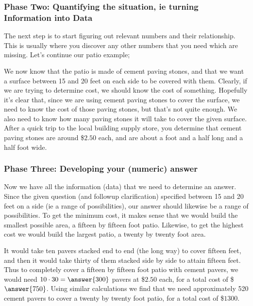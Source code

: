 \documentclass{ximera}
\begin{document}
\subsubsection*{Phase Two: Quantifying the situation, ie turning Information into Data}

    \begin{explanation}
        The next step is to start figuring out relevant numbers and their relationship. This is usually where you discover any other numbers that you need which are missing. Let's continue our patio example;
        
        We now know that the patio is made of cement paving stones, and that we want a surface between 15 and 20 feet on each side to be covered with them. Clearly, if we are trying to determine cost, we should know the cost of something. Hopefully it's clear that, since we are using cement paving stones to cover the surface, we need to know the cost of those paving stones, but that's not quite enough. We also need to know how many paving stones it will take to cover the given surface. After a quick trip to the local building supply store, you determine that cement paving stones are around \$$2.50$ each, and are about a foot and a half long and a half foot wide.
    \end{explanation}
    
\subsubsection*{Phase Three: Developing your (numeric) answer}

    \begin{example}
        Now we have all the information (data) that we need to determine an answer. Since the given question (and followup clarification) specified between 15 and 20 feet on a side (ie a range of possibilities), our answer should likewise be a range of possibilities. To get the minimum cost, it makes sense that we would build the smallest possible area, a fifteen by fifteen foot patio. Likewise, to get the highest cost we would build the largest patio, a twenty by twenty foot area.
        
        It would take ten pavers stacked end to end (the long way) to cover fifteen feet, and then it would take thirty of them stacked side by side to attain fifteen feet. Thus to completely cover a fifteen by fifteen foot patio with cement pavers, we would need $10 \cdot 30 = \answer{300}$ pavers at \$$2.50$ each, for a total cost of \$$\answer{750}$. Using similar calculations we find that we need approximately 520 cement pavers to cover a twenty by twenty foot patio, for a total cost of \$$1300$.
    \end{example}
    
\end{document}
